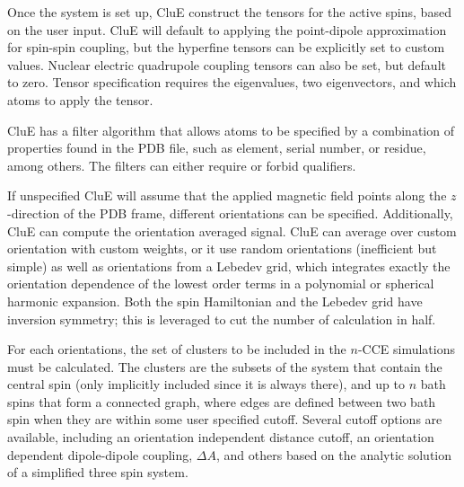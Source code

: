 \documentclass{book}
\begin{document}
Once the system is set up, CluE construct the tensors for the active spins,
based on the user input.  CluE will default to applying the point-dipole 
approximation for spin-spin coupling, but the hyperfine tensors can be 
explicitly set to custom values.  
Nuclear electric quadrupole coupling tensors can also be set, but default to 
zero.  Tensor specification requires the eigenvalues, two eigenvectors,
and which atoms to apply the tensor.

CluE has a filter algorithm that allows atoms to be specified by a combination 
of properties found in the PDB file, such as element, serial number, or residue,
among others.  The filters can either require or forbid qualifiers.
  
If unspecified CluE will assume that the applied magnetic field points
along the $z$-direction of the PDB frame, different orientations can be
specified.  Additionally, CluE can compute the orientation averaged signal.
CluE can average over custom orientation with custom weights, 
or it use random orientations (inefficient but simple) 
as well as orientations from a Lebedev grid, which integrates exactly 
the orientation dependence of the lowest order terms in a 
polynomial or spherical harmonic expansion\cite{1999_Lebedev}.  
Both the spin Hamiltonian and the Lebedev grid have inversion symmetry; 
this is leveraged to cut the number of calculation in half.

For each orientations, the set of clusters to be included in the $n$-CCE 
simulations must be calculated.  The clusters are the subsets of the system
that contain the central spin (only implicitly included since it is always 
there), and up to $n$ bath spins that form a connected graph, where edges are
defined between two bath spin when they are within some user specified cutoff.
Several cutoff options are available, including 
an orientation independent distance cutoff, 
an orientation dependent dipole-dipole coupling, $\Delta A$, and others
based on the analytic solution of a simplified three spin system.
\end{document}
